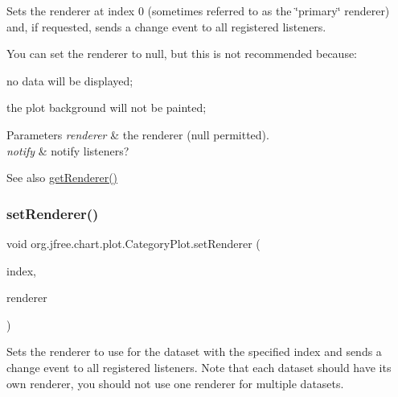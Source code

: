Sets the renderer at index 0 (sometimes referred to as the \char`\"{}primary\char`\"{} renderer) and, if requested, sends a change event to all registered listeners. 

You can set the renderer to {\ttfamily null}, but this is not recommended because\+: 
\begin{DoxyItemize}
\item no data will be displayed; 
\item the plot background will not be painted; 
\end{DoxyItemize}


\begin{DoxyParams}{Parameters}
{\em renderer} & the renderer ({\ttfamily null} permitted). \\
\hline
{\em notify} & notify listeners?\\
\hline
\end{DoxyParams}
\begin{DoxySeeAlso}{See also}
\mbox{\hyperlink{classorg_1_1jfree_1_1chart_1_1plot_1_1_category_plot_aa00ab3d14f76887f00095323f2538d14}{get\+Renderer()}} 
\end{DoxySeeAlso}
\mbox{\label{classorg_1_1jfree_1_1chart_1_1plot_1_1_category_plot_a59619047a04bd5ab557db570e8bb53cb}} 
\subsubsection{\texorpdfstring{set\+Renderer()}{setRenderer()}\hspace{0.1cm}{\footnotesize\ttfamily [3/4]}}
{\footnotesize\ttfamily void org.\+jfree.\+chart.\+plot.\+Category\+Plot.\+set\+Renderer (\begin{DoxyParamCaption}\item[{int}]{index,  }\item[{\mbox{\hyperlink{interfaceorg_1_1jfree_1_1chart_1_1renderer_1_1category_1_1_category_item_renderer}{Category\+Item\+Renderer}}}]{renderer }\end{DoxyParamCaption})}

Sets the renderer to use for the dataset with the specified index and sends a change event to all registered listeners. Note that each dataset should have its own renderer, you should not use one renderer for multiple datasets.


